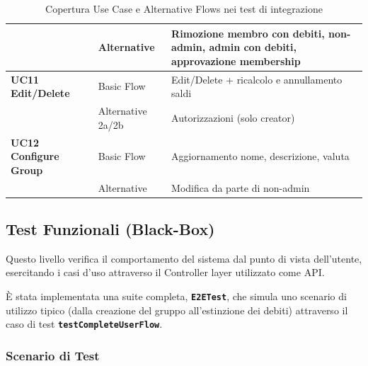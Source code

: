 \begin{table}[H]
\begin{tabularx}{\textwidth}{@{} l l X @{}}
        & Alternative & Rimozione membro con debiti, non-admin, admin con debiti, approvazione membership \\
        \midrule
        \textbf{UC11 Edit/Delete} & Basic Flow & Edit/Delete + ricalcolo e annullamento saldi \\
        & Alternative 2a/2b & Autorizzazioni (solo creator) \\
        \midrule
        \textbf{UC12 Configure Group} & Basic Flow & Aggiornamento nome, descrizione, valuta \\
        & Alternative & Modifica da parte di non-admin \\
        \bottomrule
    \end{tabularx}
    \caption{Copertura Use Case e Alternative Flows nei test di integrazione}
    \label{tab:coverage_integration}
\end{table}

\subsection{Test Funzionali (Black-Box)}
\label{sec:testing_e2e}
Questo livello verifica il comportamento del sistema dal punto di vista dell’utente, esercitando i casi d’uso attraverso il Controller layer utilizzato come API.

È stata implementata una suite completa, \textbf{\texttt{E2ETest}}, che simula uno scenario di utilizzo tipico (dalla creazione del gruppo all'estinzione dei debiti) attraverso il caso di test \textbf{\texttt{testCompleteUserFlow}}.

\subsubsection{Scenario di Test}

